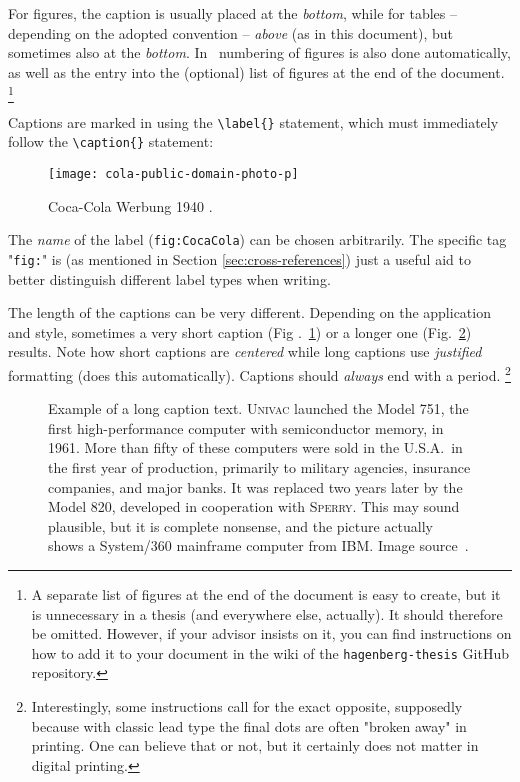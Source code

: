 For figures, the caption is usually placed at the \emph{bottom}, while for
tables -- depending on the adopted convention -- \emph{above} (as in this
document), but sometimes also at the \emph{bottom}. In \latex\ numbering of
figures is also done automatically, as well as the entry into the (optional)
list of figures at the end of the document.%
\footnote{A separate list of figures at the end of the document is easy to
create, but it is unnecessary in a thesis (and everywhere else, actually).
It should therefore be omitted. However, if your advisor insists on it, you can
find instructions on how to add it to your document in the wiki of the
\texttt{hagenberg-thesis} GitHub repository.}

Captions are marked in \latex using the \verb!\label{}! statement, which must
immediately follow the \verb!\caption{}! statement:
%
\begin{LaTeXCode}[numbers=none]
    \begin{figure}
        \centering
        \texttt{[image: cola-public-domain-photo-p]}
        \caption{Coca-Cola Werbung 1940 \cite{CocaCola1940}.}
        \label{fig:CocaCola}
    \end{figure}
\end{LaTeXCode}
%
The \emph{name} of the label (\texttt{fig:CocaCola}) can be chosen
arbitrarily. The specific tag "\texttt{fig:}" is (as mentioned in Section
\ref{sec:cross-references}) just a useful aid to better distinguish different
label types when writing.

The length of the captions can be very different. Depending on the
application and style, sometimes a very short caption (Fig
.~\ref{fig:CocaCola}) or a longer one (Fig.~\ref{fig:ibm360}) results. Note
how short captions are \emph{centered} while long captions use
\emph{justified} formatting (\latex does this automatically). Captions should
\emph{always} end with a period.%
\footnote{Interestingly, some instructions call for the exact opposite,
    supposedly because with classic lead type the final dots are often
    "broken away" in printing. One can believe that or not, but it certainly
    does not matter in digital printing.}

\begin{figure}
    \centering
    \caption{Example of a long caption text. \textsc{Univac} launched the
    Model 751, the first high-performance computer with semiconductor memory,
        in 1961. More than fifty of these computers were sold in the U.S.A.\
        in the first year of production, primarily to military agencies,
        insurance companies, and major banks. It was replaced two years later
        by the Model 820, developed in cooperation with \textsc{Sperry}. This
        may sound plausible, but it is complete nonsense, and the picture
        actually shows a System/360 mainframe computer from IBM. Image
        source~\cite{IBM360}.}
    \label{fig:ibm360}
\end{figure}


